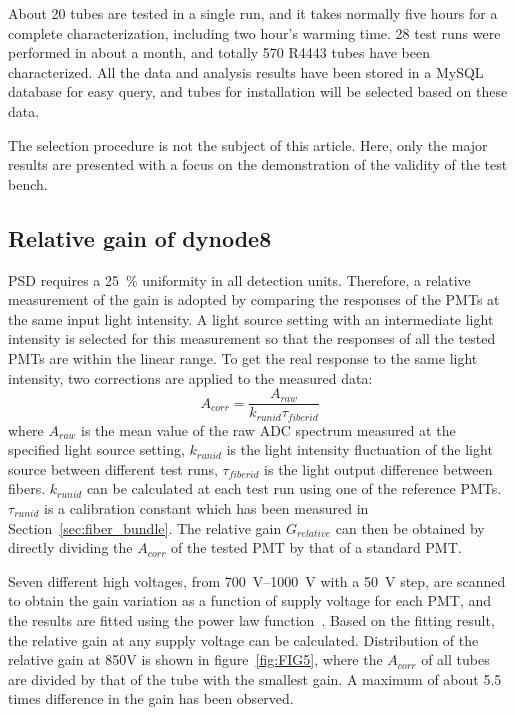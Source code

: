 \documentclass{JINST}
\begin{document}
About 20 tubes are tested in a single run, and it takes normally five hours for a complete characterization, including two hour's warming time. 
28 test runs were performed in about a month, and totally 570 R4443 tubes have been characterized. 
All the data and analysis results have been stored in a MySQL database for easy query, and tubes for installation will be selected based on these data.
	
The selection procedure is not the subject of this article.
Here, only the major results are presented with a focus on the demonstration of the validity of the test bench. 
	
\subsection{Relative gain of dynode8}
\label{sec:psd_gain}
	
PSD requires a \SI{25}{\percent} uniformity in all detection units. 
Therefore, a relative measurement of the gain is adopted by comparing the responses of the PMTs at the same input light intensity.
A light source setting with an intermediate light intensity is selected for this measurement so that the responses of all the tested PMTs are within the linear range.    
To get the real response to the same light intensity, two corrections are applied to the measured data:
\begin{equation}
	A_{corr} = \frac{A_{raw}}{k_{runid}\tau_{fiberid}}
\end{equation} 
where $A_{raw}$ is the mean value of the raw ADC spectrum measured at the specified light source setting,
$k_{runid}$ is the light intensity fluctuation of the light source between different test runs,
$\tau_{fiberid}$ is the light output difference between fibers.
$k_{runid}$ can be calculated at each test run using one of the reference PMTs.
$\tau_{runid}$ is a calibration constant which has been measured in Section~\ref{sec:fiber_bundle}.
The relative gain $G_{relative}$ can then be obtained by directly dividing the $A_{corr}$ of the tested PMT by that of a standard PMT.   
	
Seven different high voltages, from \SIrange{700}{1000}{\volt} with a \SI{50}{\volt} step, are scanned to obtain the gain variation as a function of supply voltage for each PMT, and the results are fitted using the power law function~\cite{hamamatsu}.
Based on the fitting result, the relative gain at any supply voltage can be calculated.
Distribution of the relative gain at 850V is shown in figure~\ref{fig:FIG5}, where the $A_{corr}$ of all tubes are divided by that of the tube with the smallest gain. 
A maximum of about 5.5 times difference in the gain has been observed.
	
\end{document}
